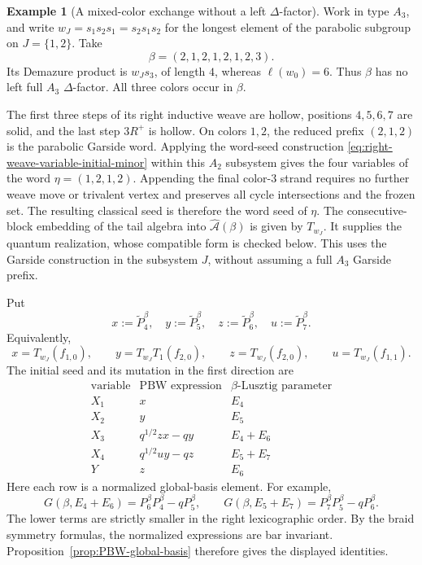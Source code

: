 \documentclass[12pt, reqno]{amsart}
\theoremstyle{plain}
\theoremstyle{definition}
\newtheorem{example}[theorem]{Example}
\numberwithin{equation}{section}
\newcommand{\cA}{\mathcal{A}}
\begin{document}
\begin{example}[A mixed-color exchange without a left \(\Delta\)-factor]
\label{ex:mixed-color-T-system}
Work in type \(A_3\), and write \(w_J=s_1s_2s_1=s_2s_1s_2\)
for the longest element of the parabolic subgroup on \(J=\{1,2\}\).
Take
\[
 \beta=(2,1,2,1,2,1,2,3).
\]
Its Demazure product is \(w_Js_3\), of length \(4\), whereas
\(\ell(w_0)=6\). Thus \(\beta\) has no left full \(A_3\)
\(\Delta\)-factor. All three colors occur in \(\beta\).

The first three steps of its right inductive weave are hollow,
positions \(4,5,6,7\) are solid, and the last step \(3R^+\)
is hollow. On colors \(1,2\), the reduced prefix \((2,1,2)\)
is the parabolic Garside word. Applying the word-seed construction
\eqref{eq:right-weave-variable-initial-minor} within this
\(A_2\) subsystem gives the four variables of the word
\(\eta=(1,2,1,2)\). Appending the final color-\(3\) strand
requires no further weave move or trivalent vertex and preserves
all cycle intersections and the frozen set. The resulting
classical seed is therefore the word seed of \(\eta\).
The consecutive-block embedding of the tail algebra into
\(\widehat{\cA}(\beta)\) is given by \(T_{w_J}\). It supplies
the quantum realization, whose compatible form is checked below.
This uses the Garside construction in the subsystem \(J\), without
assuming a full \(A_3\) Garside prefix.

Put
\[
 x:=\widetilde P_4^\beta,\quad
 y:=\widetilde P_5^\beta,\quad
 z:=\widetilde P_6^\beta,\quad
 u:=\widetilde P_7^\beta.
\]
Equivalently,
\[
 x=T_{w_J}(f_{1,0}),\qquad
 y=T_{w_J}T_1(f_{2,0}),\qquad
 z=T_{w_J}(f_{2,0}),\qquad
 u=T_{w_J}(f_{1,1}).
\]
The initial seed and its mutation in the first direction are
\[
\begin{array}{c|c|c}
 \text{variable}&\text{PBW expression}&\beta\text{-Lusztig parameter}
 \\ \hline
 X_1&x&E_4\\
 X_2&y&E_5\\
 X_3&q^{1/2}zx-qy&E_4+E_6\\
 X_4&q^{1/2}uy-qz&E_5+E_7\\
 Y&z&E_6
\end{array}
\]
Here each row is a normalized global-basis element. For example,
\[
 G(\beta,E_4+E_6)=P_6^\beta P_4^\beta-qP_5^\beta,
 \qquad
 G(\beta,E_5+E_7)=P_7^\beta P_5^\beta-qP_6^\beta.
\]
The lower terms are strictly smaller in the right lexicographic order.
By the braid symmetry formulas, the normalized expressions are bar
invariant. Proposition~\ref{prop:PBW-global-basis} therefore gives
the displayed identities.


\end{example}
\end{document}
